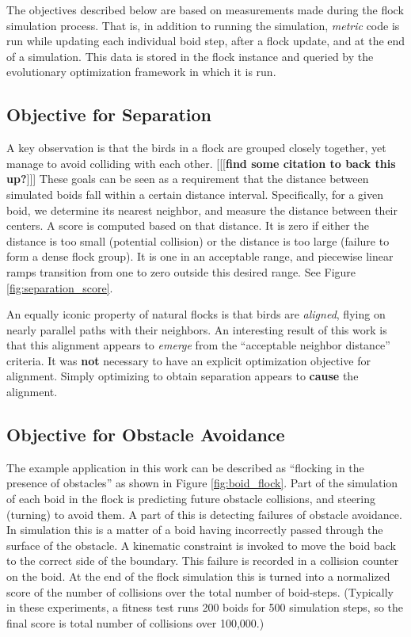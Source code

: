 \documentclass[letterpaper]{article}
\begin{document}
The objectives described below are based on measurements made during the flock simulation process. That is, in addition to running the simulation, \textit{metric} code is run while updating each individual boid step, after a flock update, and at the end of a simulation. This data is stored in the flock instance and queried by the evolutionary optimization framework in which it is run.

\subsection{Objective for Separation}
\label{subsec:separation_objective}

A key observation is that the birds in a flock are grouped closely together, yet manage to avoid colliding with each other. [[[\textbf{find some citation to back this up?}]]] These goals can be seen as a requirement that the distance between simulated boids fall within a certain distance interval. Specifically, for a given boid, we determine its nearest neighbor, and measure the distance between their centers. A score is computed based on that distance. It is zero if either the distance is too small (potential collision) or the distance is too large (failure to form a dense flock group). It is one in an acceptable range, and piecewise linear ramps transition from one to zero outside this desired range. See Figure \ref{fig:separation_score}.

An equally iconic property of natural flocks is that birds are \textit{aligned}, flying on nearly parallel paths with their neighbors. An interesting result of this work is that this alignment appears to \textit{emerge} from the ``acceptable neighbor distance'' criteria. It was \textbf{not} necessary to have an explicit optimization objective for alignment. Simply optimizing to obtain separation appears to \textbf{cause} the alignment.

\subsection{Objective for Obstacle Avoidance}
\label{subsec:avoidance_objective}

The example application in this work can be described as ``flocking in the presence of obstacles'' as shown in Figure \ref{fig:boid_flock}. Part of the simulation of each boid in the flock is predicting future obstacle collisions, and steering (turning) to avoid them. A part of this is detecting failures of obstacle avoidance. In simulation this is a matter of a boid having incorrectly passed through the surface of the obstacle. A kinematic constraint is invoked to move the boid back to the correct side of the boundary. This failure is recorded in a collision counter on the boid. At the end of the flock simulation this is turned into a normalized score of the number of collisions over the total number of boid-steps. (Typically in these experiments, a fitness test runs 200 boids for 500 simulation steps, so the final score is total number of collisions over 100,000.)
\end{document}
